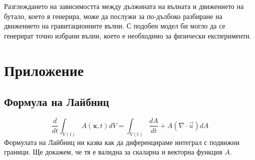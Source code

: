 \documentclass[12pt]{article}
\numberwithin{equation}{section}
\begin{document}
Разглеждането на зависимостта между дължината на вълната и движението на бутало, което я генерира, може да послужи за по-дълбоко разбиране на движението на гравитационните вълни. С подобен модел би могло да се генерират точно избрани вълни, което е необходимо за физически експерименти.

\clearpage
\section{Приложение}
\appendix


\renewcommand{\thesubsection}{\Alph{subsection}}

\subsection{Формула на Лайбниц}
\label{a:leib-proof}
\begin{equation}
    \label{e:leib-main}
    \frac{d}{dt}\int_{V(t)}A(\mathbf{x}, t) dV = \int_{V(t)}\frac{dA}{dt}+A( \nabla\cdot\vec{u})  dA
\end{equation}
Формулата на Лайбниц ни казва как да диференцираме интеграл с подвижни граници. Ще докажем, че тя е валидна за скаларна и векторна функция $A$.
\end{document}
